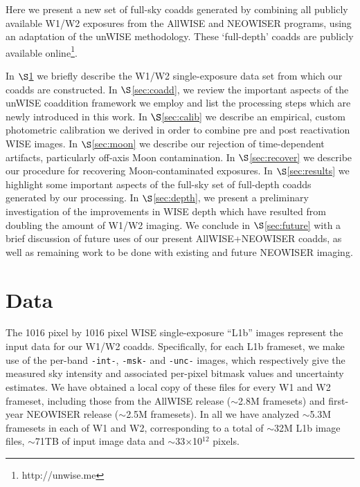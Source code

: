 \documentclass{emulateapj}
\begin{document}

Here we present a new set of full-sky coadds generated by
combining all publicly available W1/W2 exposures from the AllWISE and NEOWISER
programs, using an adaptation of the \cite{lang14} unWISE methodology. These 
`full-depth' coadds are publicly available online\footnote{http://unwise.me}.

In $\S$\ref{sec:data} we briefly describe the W1/W2 single-exposure data set 
from which our coadds are constructed. In $\S$\ref{sec:coadd}, we review the 
important aspects of the unWISE coaddition framework we employ and list the 
processing steps which are newly introduced in this work. In 
$\S$\ref{sec:calib} we describe an empirical, custom photometric calibration we
derived in order to combine pre and post reactivation WISE images. In 
$\S$\ref{sec:moon} we describe our rejection of time-dependent artifacts, 
particularly off-axis Moon contamination. In $\S$\ref{sec:recover} we describe
our procedure for recovering Moon-contaminated exposures. In 
$\S$\ref{sec:results} we highlight some important aspects of the full-sky set 
of full-depth coadds generated by our processing. In $\S$\ref{sec:depth}, we 
present a preliminary investigation of the improvements in WISE depth which 
have resulted from doubling the amount of W1/W2 imaging. We conclude in 
$\S$\ref{sec:future} with a brief discussion of future uses of our present 
AllWISE+NEOWISER coadds, as well as remaining work to be done with existing and 
future NEOWISER imaging.

\section{Data}
\label{sec:data}

The 1016 pixel by 1016 pixel WISE single-exposure ``L1b'' images represent
the input data for our W1/W2 coadds. Specifically, for each L1b frameset, we 
make use of the per-band \verb|-int-|, \verb|-msk-| and \verb|-unc-| images, 
which respectively give the measured sky intensity and associated per-pixel 
bitmask values and uncertainty estimates. We have obtained a local copy of 
these files for every W1 and W2 frameset, including those from the AllWISE 
release ($\sim$2.8M framesets) and first-year NEOWISER release ($\sim$2.5M 
framesets). In all we have analyzed $\sim$5.3M framesets in each of W1 and 
W2, corresponding to a total of $\sim$32M L1b image files, $\sim$71TB of 
input image data and $\sim$33$\times$10$^{12}$ pixels.
\end{document}
